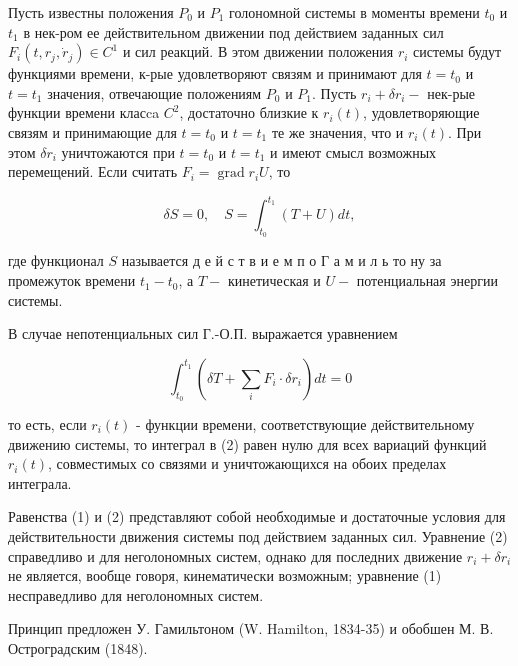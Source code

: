 \documentclass[10pt]{article}
\begin{document}
Пусть известны положения $P_{0}$ и $P_{1}$ голономной системы в моменты времени $t_{0}$ и $t_{1}$ в нек-ром ее действительном движении под действием заданных сил $F_{i}\left(t, r_{j}, \dot{r}_{j}\right) \in C^{1}$ и сил реакций. В этом движении положения $r_{i}$ системы будут функциями времени, к-рые удовлетворяют связям и принимают для $t=t_{0}$ и $t=t_{1}$ значения, отвечающие положениям $P_{0}$ и $P_{1}$. Пусть $r_{i}+\delta r_{i}-$ нек-рые функции времени класca $C^{2}$, достаточно близкие к $r_{i}(t)$, удовлетворяющие связям и принимающие для $t=t_{0}$ и $t=t_{1}$ те же значения, что и $r_{i}(t)$. При этом $\delta r_{i}$ уничтожаются при $t=t_{0}$ и $t=t_{1}$ и имеют смысл возможных перемещений. Если считать $F_{i}=\operatorname{grad} r_{i} U$, то



\[

\delta S=0, \quad S=\int_{t_{0}}^{t_{1}}(T+U) d t,

\]



где функционал $S$ называется д е й с т в и е м п о Г а м и л ь то ну за промежуток времени $t_{1}-t_{0}$, а $T-$ кинетическая и $U-$ потенциальная энергии системы.



В случае непотенциальных сил Г.-О.П. выражается уравнением



\[

\int_{t_{0}}^{t_{1}}\left(\delta T+\sum_{i} F_{i} \cdot \delta r_{i}\right) d t=0

\]



то есть, если $r_{i}(t)$ - функции времени, соответствующие действительному движению системы, то интеграл в (2) равен нулю для всех вариаций функций $r_{i}(t)$, совместимых со связями и уничтожающихся на обоих пределах интеграла.



Равенства (1) и (2) представляют собой необходимые и достаточные условия для действительности движения системы под действием заданных сил. Уравнение (2) справедливо и для неголономных систем, однако для последних движение $r_{i}+\delta r_{i}$ не является, вообще говоря, кинематически возможным; уравнение (1) несправедливо для неголономных систем.



Принцип предложен У. Гамильтоном (W. Hamilton, 1834-35) и обобшен М. В. Остроградским (1848).
\end{document}
